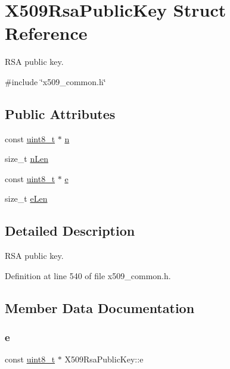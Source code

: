 \hypertarget{structX509RsaPublicKey}{}\section{X509\+Rsa\+Public\+Key Struct Reference}
\label{structX509RsaPublicKey}


R\+SA public key.  




{\ttfamily \#include \char`\"{}x509\+\_\+common.\+h\char`\"{}}

\subsection*{Public Attributes}
\begin{DoxyCompactItemize}
\item 
const \hyperlink{stdint_8h_aba7bc1797add20fe3efdf37ced1182c5}{uint8\+\_\+t} $\ast$ \hyperlink{structX509RsaPublicKey_acda40dfd0c6f2b68e0ba227e59bfb727}{n}
\item 
size\+\_\+t \hyperlink{structX509RsaPublicKey_a8311e7f5f00c9faaf36640f9dbd7cdb5}{n\+Len}
\item 
const \hyperlink{stdint_8h_aba7bc1797add20fe3efdf37ced1182c5}{uint8\+\_\+t} $\ast$ \hyperlink{structX509RsaPublicKey_a13db0b045295934879aa34cea8996ef6}{e}
\item 
size\+\_\+t \hyperlink{structX509RsaPublicKey_af531c21f55e40fb06165cd151dd96fa4}{e\+Len}
\end{DoxyCompactItemize}


\subsection{Detailed Description}
R\+SA public key. 

Definition at line 540 of file x509\+\_\+common.\+h.



\subsection{Member Data Documentation}
\mbox{\label{structX509RsaPublicKey_a13db0b045295934879aa34cea8996ef6}} 
\subsubsection{\texorpdfstring{e}{e}}
{\footnotesize\ttfamily const \hyperlink{stdint_8h_aba7bc1797add20fe3efdf37ced1182c5}{uint8\+\_\+t} $\ast$ X509\+Rsa\+Public\+Key\+::e}



